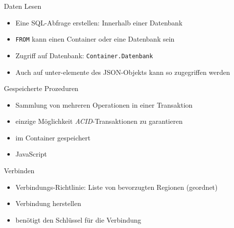 \begin{flashcard}[Definition]{Daten Lesen}
    \begin{itemize}
        \item Eine SQL-Abfrage erstellen: Innerhalb einer Datenbank
        \item \texttt{FROM} kann einen Container oder eine Datenbank sein
        \item Zugriff auf Datenbank: \texttt{Container.Datenbank}
        \item Auch auf unter-elemente des JSON-Objekts kann so zugegriffen werden
    \end{itemize}
\end{flashcard}

\begin{flashcard}[Definition]{Gespeicherte Prozeduren}
    \begin{itemize}
        \item Sammlung von mehreren Operationen in einer Transaktion
        \item einzige Möglichkeit \emph{ACID}-Transaktionen zu garantieren
        \item im Container gespeichert
        \item JavaScript
    \end{itemize}
\end{flashcard}

\begin{flashcard}[Definition]{Verbinden}
    \begin{itemize}
        \item Verbindungs-Richtlinie: Liste von bevorzugten Regionen (geordnet)
        \item Verbindung herstellen
        \item benötigt den Schlüssel für die Verbindung
    \end{itemize}
\end{flashcard}


